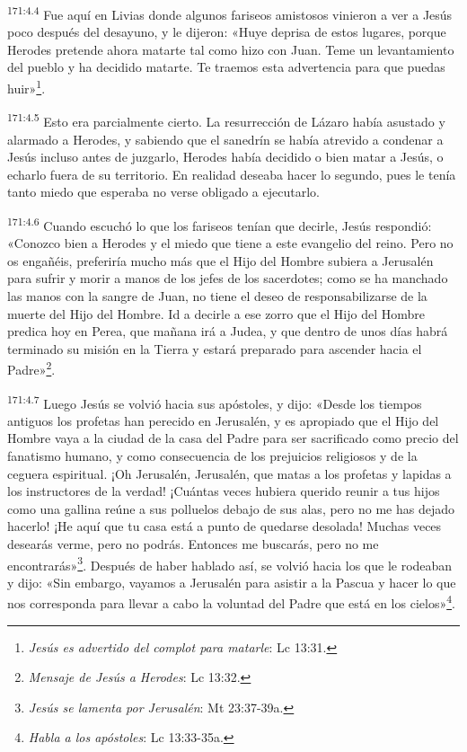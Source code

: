 \par 
\textsuperscript{171:4.4} Fue aquí en Livias donde algunos fariseos amistosos vinieron a ver a Jesús poco después del desayuno, y le dijeron: «Huye deprisa de estos lugares, porque Herodes pretende ahora matarte tal como hizo con Juan. Teme un levantamiento del pueblo y ha decidido matarte. Te traemos esta advertencia para que puedas huir»\footnote{\textit{Jesús es advertido del complot para matarle}: Lc 13:31.}.

\par 
\textsuperscript{171:4.5} Esto era parcialmente cierto. La resurrección de Lázaro había asustado y alarmado a Herodes, y sabiendo que el sanedrín se había atrevido a condenar a Jesús incluso antes de juzgarlo, Herodes había decidido o bien matar a Jesús, o echarlo fuera de su territorio. En realidad deseaba hacer lo segundo, pues le tenía tanto miedo que esperaba no verse obligado a ejecutarlo.

\par 
\textsuperscript{171:4.6} Cuando escuchó lo que los fariseos tenían que decirle, Jesús respondió: «Conozco bien a Herodes y el miedo que tiene a este evangelio del reino. Pero no os engañéis, preferiría mucho más que el Hijo del Hombre subiera a Jerusalén para sufrir y morir a manos de los jefes de los sacerdotes; como se ha manchado las manos con la sangre de Juan, no tiene el deseo de responsabilizarse de la muerte del Hijo del Hombre. Id a decirle a ese zorro que el Hijo del Hombre predica hoy en Perea, que mañana irá a Judea, y que dentro de unos días habrá terminado su misión en la Tierra y estará preparado para ascender hacia el Padre»\footnote{\textit{Mensaje de Jesús a Herodes}: Lc 13:32.}.

\par 
\textsuperscript{171:4.7} Luego Jesús se volvió hacia sus apóstoles, y dijo: «Desde los tiempos antiguos los profetas han perecido en Jerusalén, y es apropiado que el Hijo del Hombre vaya a la ciudad de la casa del Padre para ser sacrificado como precio del fanatismo humano, y como consecuencia de los prejuicios religiosos y de la ceguera espiritual. ¡Oh Jerusalén, Jerusalén, que matas a los profetas y lapidas a los instructores de la verdad! ¡Cuántas veces hubiera querido reunir a tus hijos como una gallina reúne a sus polluelos debajo de sus alas, pero no me has dejado hacerlo! ¡He aquí que tu casa está a punto de quedarse desolada! Muchas veces desearás verme, pero no podrás. Entonces me buscarás, pero no me encontrarás»\footnote{\textit{Jesús se lamenta por Jerusalén}: Mt 23:37-39a.}. Después de haber hablado así, se volvió hacia los que le rodeaban y dijo: «Sin embargo, vayamos a Jerusalén para asistir a la Pascua y hacer lo que nos corresponda para llevar a cabo la voluntad del Padre que está en los cielos»\footnote{\textit{Habla a los apóstoles}: Lc 13:33-35a.}.

